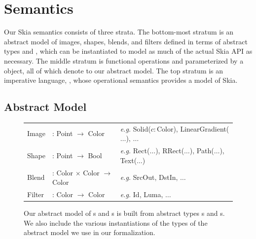 \documentclass[main.tex]{subfiles}
\begin{document}
\section{Semantics}
\label{sec:semantics}

Our Skia semantics consists of three strata.
The bottom-most stratum is an abstract model of
  images, shapes, blends, and filters defined in terms
  of abstract types \Point and \Color,
  which can be instantiated to model
  as much of the actual Skia API as necessary.
The middle stratum is functional operations
  \DrawShape and \BlendLayer
  parameterized by a \Paint object,
  all of which denote to our abstract model.
The top stratum is an imperative language, \muskia,
  whose operational semantics provides a model of Skia.

\subsection{Abstract Model}
\label{subsec:abstractmodel}

\begin{figure}
  \centering
  \begin{tabular}{L L L}
    Image  & : \; Point $\to$ Color & \textrm{\textit{e.g.}}\; {\sffamily
                                      Solid($c : \text{Color}$), LinearGradient($\ldots$),
                                      $\ldots$} \\[4pt]
    Shape  & : \; Point $\to$ Bool & \textrm{\textit{e.g.}}\; {\sffamily
                                     Rect($\ldots$), RRect($\ldots$),
                                     Path($\ldots$), Text($\ldots$)} \\[4pt]
    Blend  & : \; Color $\times$ Color $\to$ Color & \textrm{\textit{e.g.}}\;
                                                     {\sffamily SrcOut, DstIn,
                                                     $\ldots$} \\[4pt]
    Filter & : \; Color $\to$ Color & \textrm{\textit{e.g.}}\; {\sffamily Id,
                                      Luma, $\ldots$}
  \end{tabular}
  \caption{%
    Our abstract model of \Image{}s
      and \Shape{}s is built from
      abstract types \Point{}s and \Color{}s.
    We also include the various instantiations of the types of the abstract model we use in
      our formalization.
  }
\label{fig:model}
\end{figure}
\end{document}
